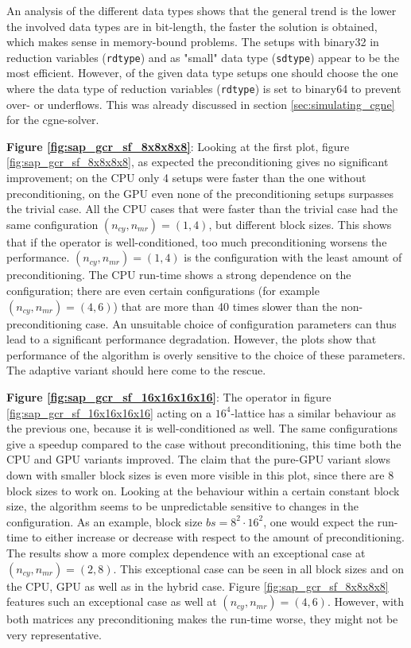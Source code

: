 \documentclass{article}
\theoremstyle{plain} %
\theoremstyle{convention} %
\theoremstyle{remark} %
\def\code#1{\texttt{#1}}
\numberwithin{equation}{section}
\begin{document}
An analysis of the different data types shows that the general trend is the lower the involved data types are in bit-length, the faster the solution is obtained, which makes sense in memory-bound problems. The setups with \gls{binary32} in reduction variables (\code{rdtype}) and as "small" data type (\code{sdtype}) appear to be the most efficient. However, of the given data type setups one should choose the one where the data type of reduction variables (\code{rdtype}) is set to \gls{binary64} to prevent over- or underflows. This was already discussed in section \ref{sec:simulating_cgne} for the \acrshort{cgne}-solver.

\textbf{Figure \ref{fig:sap_gcr_sf_8x8x8x8}}: Looking at the first plot, figure \ref{fig:sap_gcr_sf_8x8x8x8}, as expected the preconditioning gives no significant improvement; on the CPU only \num{4} setups were faster than the one without preconditioning, on the GPU even none of the preconditioning setups surpasses the trivial case. All the CPU cases that were faster than the trivial case had the same configuration $(n_{cy}, n_{mr}) = (1,4)$, but different block sizes. This shows that if the operator is well-conditioned, too much preconditioning worsens the performance. $(n_{cy}, n_{mr}) = (1,4)$ is the configuration with the least amount of preconditioning. The CPU run-time shows a strong dependence on the configuration; there are even certain configurations (for example $(n_{cy}, n_{mr}) = (4,6)$) that are more than \num{40} times slower than the non-preconditioning case. An unsuitable choice of configuration parameters can thus lead to a significant performance degradation. However, the plots show that performance of the algorithm is overly sensitive to the choice of these parameters. The adaptive variant should here come to the rescue.

\textbf{Figure \ref{fig:sap_gcr_sf_16x16x16x16}}: The operator in figure \ref{fig:sap_gcr_sf_16x16x16x16} acting on a $16^4$-lattice has a similar behaviour as the previous one, because it is well-conditioned as well. The same configurations give a speedup compared to the case without preconditioning, this time both the CPU and GPU variants improved. The claim that the pure-GPU variant slows down with smaller block sizes is even more visible in this plot, since there are \num{8} block sizes to work on. Looking at the behaviour within a certain constant block size, the algorithm seems to be unpredictable sensitive to changes in the configuration. As an example, block size $bs= 8^2 \cdot 16^2$, one would expect the run-time to either increase or decrease with respect to the amount of preconditioning. The results show a more complex dependence with an exceptional case at $(n_{cy}, n_{mr}) = (2,8)$. This exceptional case can be seen in all block sizes and on the CPU, GPU as well as in the hybrid case. Figure \ref{fig:sap_gcr_sf_8x8x8x8} features such an exceptional case as well at $(n_{cy}, n_{mr}) = (4,6)$. However, with both matrices any preconditioning makes the run-time worse, they might not be very representative.
\end{document}
